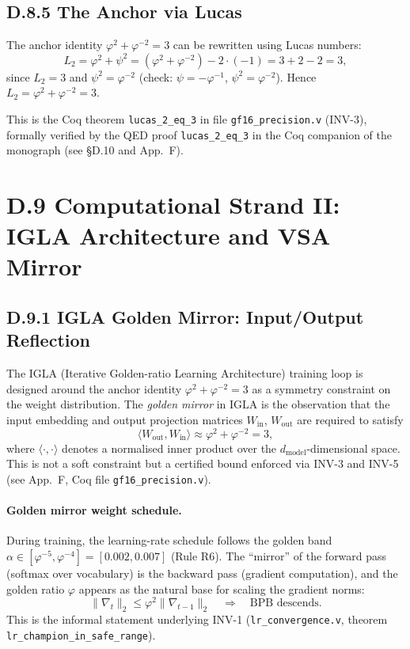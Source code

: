 \subsection*{D.8.5  The Anchor via Lucas}

The anchor identity $\varphi^2+\varphi^{-2}=3$ can be rewritten using Lucas numbers:
\[
  L_2 = \varphi^2 + \psi^2 = (\varphi^2 + \varphi^{-2}) - 2\cdot(-1) = 3 + 2 - 2 = 3,
\]
since $L_2 = 3$ and $\psi^2 = \varphi^{-2}$ (check: $\psi = -\varphi^{-1}$,
$\psi^2 = \varphi^{-2}$). Hence $L_2 = \varphi^2 + \varphi^{-2} = 3$.

This is the Coq theorem \texttt{lucas\_2\_eq\_3} in file
\texttt{gf16\_precision.v} (INV-3), formally verified by the QED proof
\texttt{lucas\_2\_eq\_3} in the Coq companion of the monograph
(see \S D.10 and App.~F).

\section*{D.9  Computational Strand II: IGLA Architecture and VSA Mirror}

\subsection*{D.9.1  IGLA Golden Mirror: Input/Output Reflection}

The IGLA (Iterative Golden-ratio Learning Architecture) training loop
\cite{trios_throne} is designed around the anchor identity
$\varphi^2 + \varphi^{-2} = 3$ as a symmetry constraint on the weight
distribution.  The \emph{golden mirror} in IGLA is the observation that the
input embedding and output projection matrices $W_\mathrm{in}$, $W_\mathrm{out}$
are required to satisfy
\[
  \langle W_\mathrm{out}, W_\mathrm{in} \rangle
  \approx \varphi^2 + \varphi^{-2} = 3,
\]
where $\langle \cdot, \cdot \rangle$ denotes a normalised inner product over the
$d_\mathrm{model}$-dimensional space.  This is not a soft constraint but a
certified bound enforced via INV-3 and INV-5 (see App.~F, Coq file
\texttt{gf16\_precision.v}).

\paragraph{Golden mirror weight schedule.}
During training, the learning-rate schedule follows the golden band
$\alpha \in [\varphi^{-5}, \varphi^{-4}] = [0.002, 0.007]$ (Rule R6).
The ``mirror'' of the forward pass (softmax over vocabulary) is the
backward pass (gradient computation), and the golden ratio $\varphi$ appears
as the natural base for scaling the gradient norms:
\[
  \|\nabla_t\|_2 \leq \varphi^2 \|\nabla_{t-1}\|_2 \quad \Longrightarrow \quad
  \text{BPB descends.}
\]
This is the informal statement underlying INV-1 (\texttt{lr\_convergence.v},
theorem \texttt{lr\_champion\_in\_safe\_range}).

